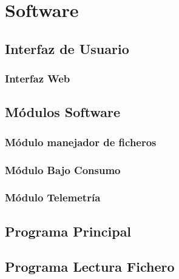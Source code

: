 \section{Software}

\subsection{Interfaz de Usuario}
\subsubsection{Interfaz Web}


\subsection{Módulos Software}
\subsubsection{Módulo manejador de ficheros}\label{subsubsec:ManejadorFicheros}








\subsubsection{Módulo Bajo Consumo}


\subsubsection{Módulo Telemetría}


\subsection{Programa Principal}


\subsection{Programa Lectura Fichero}


